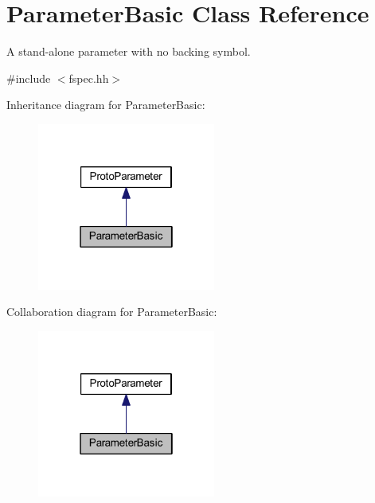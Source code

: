 \hypertarget{class_parameter_basic}{}\section{Parameter\+Basic Class Reference}
\label{class_parameter_basic}


A stand-\/alone parameter with no backing symbol.  




{\ttfamily \#include $<$fspec.\+hh$>$}



Inheritance diagram for Parameter\+Basic\+:
\nopagebreak
\begin{figure}[H]
\begin{center}
\leavevmode
\includegraphics[width=166pt]{class_parameter_basic__inherit__graph}
\end{center}
\end{figure}


Collaboration diagram for Parameter\+Basic\+:
\nopagebreak
\begin{figure}[H]
\begin{center}
\leavevmode
\includegraphics[width=166pt]{class_parameter_basic__coll__graph}
\end{center}
\end{figure}
